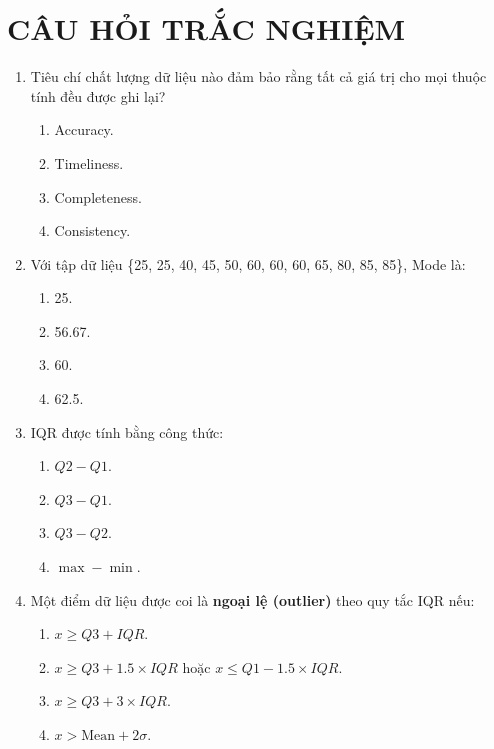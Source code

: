 \documentclass[10pt]{article}
\begin{document}
\newpage
\section{CÂU HỎI TRẮC NGHIỆM}

\begin{enumerate}[leftmargin=*, label=\textbf{Câu \arabic*.}]

    \item Tiêu chí chất lượng dữ liệu nào đảm bảo rằng tất cả giá trị cho mọi thuộc tính đều được ghi lại?
    \begin{enumerate}[label=\Alph*.]
        \item Accuracy.
        \item Timeliness.
        \item Completeness.
        \item Consistency.
    \end{enumerate}

    \item Với tập dữ liệu \{25, 25, 40, 45, 50, 60, 60, 60, 65, 80, 85, 85\}, Mode là:
    \begin{enumerate}[label=\Alph*.]
        \item 25.
        \item 56.67.
        \item 60.
        \item 62.5.
    \end{enumerate}

    \item IQR được tính bằng công thức:
    \begin{enumerate}[label=\Alph*.]
        \item $Q2 - Q1$.
        \item $Q3 - Q1$.
        \item $Q3 - Q2$.
        \item $\max - \min$.
    \end{enumerate}

    \item Một điểm dữ liệu được coi là \textbf{ngoại lệ (outlier)} theo quy tắc IQR nếu:
    \begin{enumerate}[label=\Alph*.]
        \item $x \geq Q3 + IQR$.
        \item $x \geq Q3 + 1.5 \times IQR$ hoặc $x \leq Q1 - 1.5 \times IQR$.
        \item $x \geq Q3 + 3 \times IQR$.
        \item $x > \text{Mean} + 2\sigma$.
    \end{enumerate}


\end{enumerate}
\end{document}
